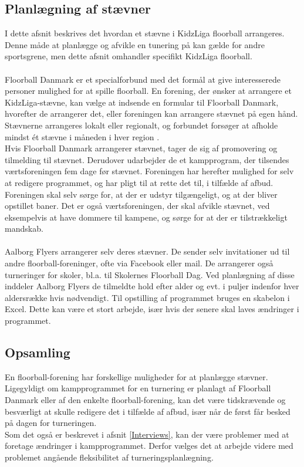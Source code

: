 \subsection{Planlægning af stævner}
I dette afsnit beskrives det hvordan et stævne i KidzLiga floorball arrangeres. Denne måde at planlægge og afvikle en tunering på kan gælde for andre sportsgrene, men dette afsnit omhandler specifikt KidzLiga floorball.
\\\\
Floorball Danmark er et specialforbund med det formål at give interesserede personer mulighed for at spille floorball. En forening, der ønsker at arrangere et KidzLiga-stævne, kan vælge at indsende en formular til Floorball Danmark, hvorefter de arrangerer det, eller foreningen kan arrangere stævnet på egen hånd. Stævnerne arrangeres lokalt eller regionalt, og forbundet forsøger at afholde mindst ét stævne i måneden i hver region \citep{kidzRegler}.\\
Hvis Floorball Danmark arrangerer stævnet, tager de sig af promovering og tilmelding til stævnet. Derudover udarbejder de et kampprogram, der tilsendes værtsforeningen fem dage før stævnet. Foreningen har herefter mulighed for selv at redigere programmet, og har pligt til at rette det til, i tilfælde af afbud.\\
Foreningen skal selv sørge for, at der er udstyr tilgængeligt, og at der bliver opstillet baner. Det er også værtsforeningen, der skal afvikle stævnet, ved eksempelvis at have dommere til kampene, og sørge for at der er tilstrækkeligt mandskab\citep{kidzRegler}. 
\\\\
Aalborg Flyers arrangerer selv deres stævner. De sender selv invitationer ud til andre floorball-foreninger, ofte via Facebook eller mail. De arrangerer også turneringer for skoler, bl.a. til Skolernes Floorball Dag. Ved planlægning af disse inddeler Aalborg Flyers de tilmeldte hold efter alder og evt. i puljer indenfor hver aldersrække hvis nødvendigt. Til opstilling af programmet bruges en skabelon i Excel. Dette kan være et stort arbejde, især hvis der senere skal laves ændringer i programmet.

\subsection*{Opsamling} 
En floorball-forening har forskellige muligheder for at planlægge stævner. Ligegyldigt om kampprogrammet for en turnering er planlagt af Floorball Danmark eller af den enkelte floorball-forening, kan det være tidskrævende og besværligt at skulle redigere det i tilfælde af afbud, især når de først får besked på dagen for turneringen.\\ 
Som det også er beskrevet i afsnit \ref{Interviews}, kan der være problemer med at foretage ændringer i kampprogrammet. Derfor vælges det at arbejde videre med problemet angående fleksibilitet af turneringsplanlægning.

